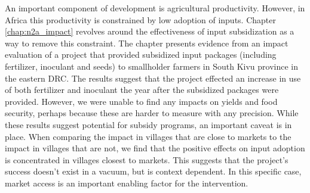 An important component of development is agricultural productivity. However, in Africa this productivity is constrained by low adoption of inputs. Chapter \ref{chap:n2a_impact} revolves around the effectiveness of input subsidization as a way to remove this constraint. The chapter presents evidence from an impact evaluation of a project that provided subsidized input packages (including fertilizer, inoculant and seeds) to smallholder farmers in South Kivu province in the eastern DRC. The results suggest that the project effected an increase in use of both fertilizer and inoculant the year after the subsidized packages were provided. However, we were unable to find any impacts on yields and food security, perhaps because these are harder to measure with any precision. While these results suggest potential for subsidy programs, an important caveat is in place. When comparing the impact in villages that are close to markets to the impact in villages that are not, we find that the positive effects on input adoption is concentrated in villages closest to markets. This suggests that the project's success doesn't exist in a vacuum, but is context dependent. In this specific case, market access is an important enabling factor for the intervention.

